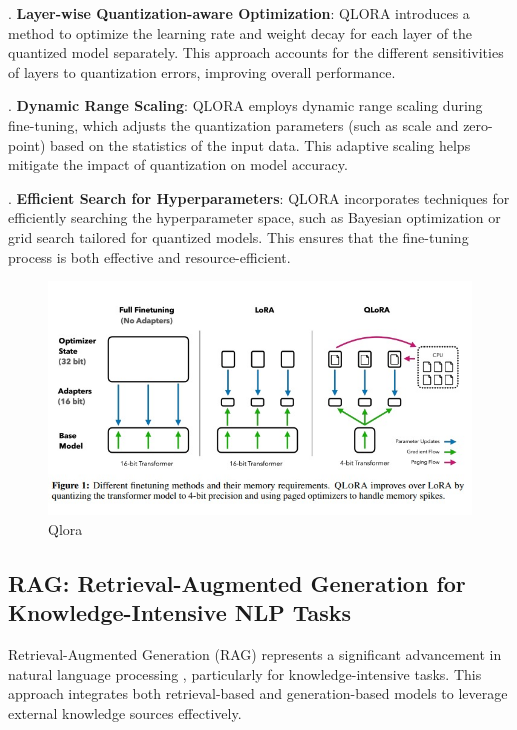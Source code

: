 \hfill {}. \textbf{Layer-wise Quantization-aware Optimization}: QLORA introduces a method to optimize the learning rate and weight decay for each layer of the quantized model separately. This approach accounts for the different sensitivities of layers to quantization errors, improving overall performance.


\hfill {}. \textbf{Dynamic Range Scaling}: QLORA employs dynamic range scaling during fine-tuning, which adjusts the quantization parameters (such as scale and zero-point) based on the statistics of the input data. This adaptive scaling helps mitigate the impact of quantization on model accuracy.


\hfill {}. \textbf{Efficient Search for Hyperparameters}: QLORA incorporates techniques for efficiently searching the hyperparameter space, such as Bayesian optimization or grid search tailored for quantized models. This ensures that the fine-tuning process is both effective and resource-efficient.

\begin{figure}[h!]
	\centering
	\includegraphics[scale=0.5]{figures/Qlora.jpeg}
	\caption{ Qlora }
\end{figure}
\newpage
\subsection{RAG: Retrieval-Augmented Generation for Knowledge-Intensive NLP Tasks}


Retrieval-Augmented Generation (RAG) represents a significant advancement in natural language processing \cite{lewis2020retrieval}, particularly for knowledge-intensive tasks. This approach integrates both retrieval-based and generation-based models to leverage external knowledge sources effectively. 

